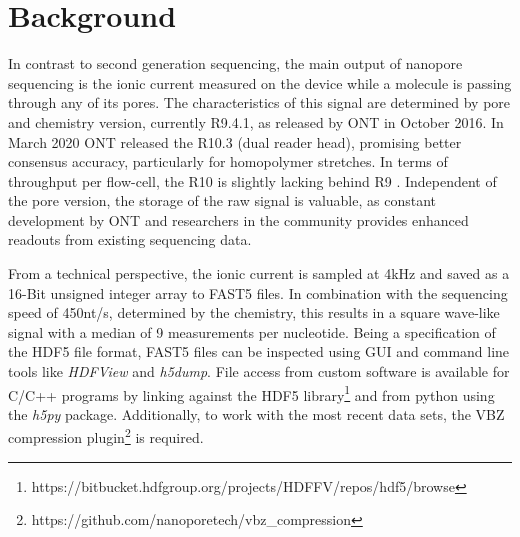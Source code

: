 
\section{Background}
\label{sec:signal:background}

In contrast to second generation sequencing, the main output of nanopore sequencing is the ionic current measured on the device while a molecule is passing through any of its pores. The characteristics of this signal are determined by pore and chemistry version, currently R9.4.1, as released by ONT in October 2016. In March 2020 ONT released the R10.3 (dual reader head), promising better consensus accuracy, particularly for homopolymer stretches. In terms of throughput per flow-cell, the R10 is slightly lacking behind R9 \cite{ONT2020}. Independent of the pore version, the storage of the raw signal is valuable, as constant development by ONT and researchers in the community provides enhanced readouts from existing sequencing data.

From a technical perspective, the ionic current is sampled at 4kHz and saved as a 16-Bit unsigned integer array to FAST5 files. In combination with the sequencing speed of \texttildelow450nt/s, determined by the chemistry, this results in a square wave-like signal with a median of 9 measurements per nucleotide. Being a specification of the HDF5 file format, FAST5 files can be inspected using GUI and command line tools like \textit{HDFView} and \textit{h5dump}. File access from custom software is available for C/C++ programs by linking against the HDF5 library\footnote{https://bitbucket.hdfgroup.org/projects/HDFFV/repos/hdf5/browse} and from python using the \textit{h5py} package. 
Additionally, to work with the most recent data sets, the VBZ compression plugin\footnote{https://github.com/nanoporetech/vbz\_compression} is required.

